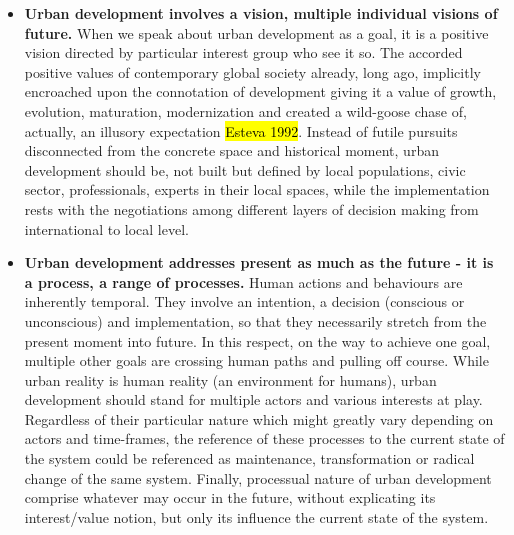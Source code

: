 \documentclass[11pt]{report}
\begin{document}
\begin{itemize}

\item \textbf{Urban development involves a vision, multiple individual visions of future.}
When we speak about urban development as a goal, it is a positive vision directed by particular interest group who see it so.
The accorded positive values of contemporary global society already, long ago, implicitly encroached upon the connotation of development giving it a value of growth, evolution, maturation, modernization and created a wild-goose chase of, actually, an illusory expectation
\hl{Esteva 1992}.
Instead of futile pursuits disconnected from the concrete space and historical moment, urban development should be, not built but defined by local populations, civic sector, professionals, experts in their local spaces, while the implementation rests with the negotiations among different layers of decision making from international to local level.

\item \textbf{Urban development addresses present as much as the future - it is a process, a range of processes.}
Human actions and behaviours are inherently temporal.
They involve an intention, a decision (conscious or unconscious) and implementation, so that they necessarily stretch from the present moment into future. In this respect, on the way to achieve one goal, multiple other goals are crossing human paths and pulling off course.
While urban reality is human reality (an environment for humans), urban development should stand for multiple actors and various interests at play.
Regardless of their particular nature which might greatly vary depending on actors and time-frames, the reference of these processes to the current state of the system could be referenced as maintenance, transformation or radical change of the same system.
Finally, processual nature of urban development comprise whatever may occur in the future, without explicating its interest/value notion, but only its influence the current state of the system.


\end{itemize}
\end{document}
